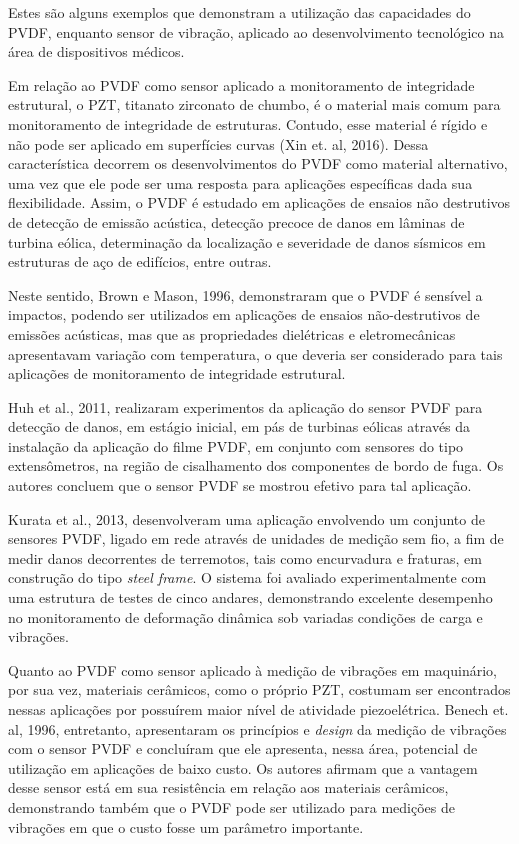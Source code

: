\documentclass[
	12pt,				
	oneside,			
	a4paper,			
	english,			
	brazil,			
	]{abntex2ppgsi}
\begin{document}
Estes são alguns exemplos que demonstram a utilização das capacidades do PVDF, enquanto sensor de vibração, aplicado ao desenvolvimento tecnológico na área de dispositivos médicos.

Em relação ao PVDF como sensor aplicado a monitoramento de integridade estrutural, o PZT, titanato zirconato de chumbo, é o material mais comum para monitoramento de integridade de estruturas. Contudo, esse material é rígido e não pode ser aplicado em superfícies curvas (Xin et. al, 2016). Dessa característica decorrem os desenvolvimentos do PVDF como material alternativo, uma vez que ele pode ser uma resposta para aplicações específicas dada sua flexibilidade. Assim, o PVDF é estudado em aplicações de ensaios não destrutivos de detecção de emissão acústica, detecção precoce de danos em lâminas de turbina eólica, determinação da localização e severidade de danos sísmicos em estruturas de aço de edifícios, entre outras.

Neste sentido, Brown e Mason, 1996, demonstraram que o PVDF é sensível a impactos, podendo ser utilizados em aplicações de ensaios não-destrutivos de emissões acústicas, mas que as propriedades dielétricas e eletromecânicas apresentavam variação com temperatura, o que deveria ser considerado para tais aplicações de monitoramento de integridade estrutural. 


Huh et al., 2011, realizaram experimentos da aplicação do sensor PVDF para detecção de danos, em estágio inicial, em pás de turbinas eólicas através da instalação da aplicação do filme PVDF, em conjunto com sensores do tipo extensômetros, na região de cisalhamento dos componentes de bordo de fuga. Os autores concluem que o sensor PVDF se mostrou efetivo para tal aplicação.

Kurata et al., 2013, desenvolveram uma aplicação envolvendo um conjunto de sensores PVDF, ligado em rede através de unidades de medição sem fio, a fim  de medir danos decorrentes de terremotos, tais como encurvadura e fraturas, em construção do tipo \textit{steel frame}. O sistema foi avaliado experimentalmente com uma estrutura de testes de cinco andares, demonstrando excelente desempenho no monitoramento de deformação dinâmica sob variadas condições de carga e vibrações.

Quanto ao PVDF como sensor aplicado à medição de vibrações em maquinário, por sua vez, materiais cerâmicos, como o próprio PZT, costumam ser encontrados nessas aplicações por possuírem maior nível de atividade piezoelétrica. Benech et. al, 1996, entretanto, apresentaram os princípios e \textit{design} da medição de vibrações com o sensor PVDF e concluíram que ele apresenta, nessa área, potencial de utilização em aplicações de baixo custo. Os autores afirmam que a vantagem desse sensor está em sua resistência em relação aos materiais cerâmicos, demonstrando também que o PVDF pode ser utilizado para medições de vibrações em que o custo fosse um parâmetro importante. 
\end{document}
